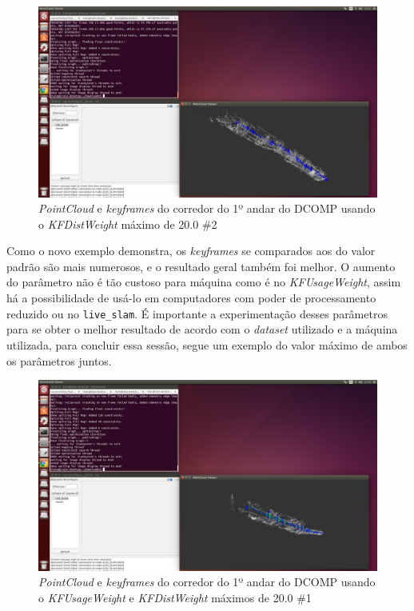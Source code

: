 \begin{figure}[!htb]
	\centering
		\includegraphics[width= \textwidth]{Imagens/figura3-39.png}
	\caption{\textit{PointCloud} e \textit{keyframes} do corredor do 1º andar do DCOMP usando o \textit{KFDistWeight} máximo de 20.0 \#2}
	\label{fig3:37}
\end{figure}

Como o novo exemplo demonstra, os \textit{keyframes} se comparados aos do valor padrão são mais numerosos, e o resultado geral também foi melhor. O aumento do parâmetro não é tão custoso para máquina como é no \textit{KFUsageWeight}, assim há a possibilidade de usá-lo em computadores com poder de processamento reduzido ou no \texttt{live\_slam}. É importante a experimentação desses parâmetros para se obter o melhor resultado de acordo com o \textit{dataset} utilizado e a máquina utilizada, para concluir essa sessão, segue um exemplo do valor máximo de ambos os parâmetros juntos.

\begin{figure}[!htb]
	\centering
		\includegraphics[width= \textwidth]{Imagens/figura3-40.png}
	\caption{\textit{PointCloud} e \textit{keyframes} do corredor do 1º andar do DCOMP usando o \textit{KFUsageWeight} e \textit{KFDistWeight} máximos de 20.0 \#1}
	\label{fig3:38}
\end{figure}

